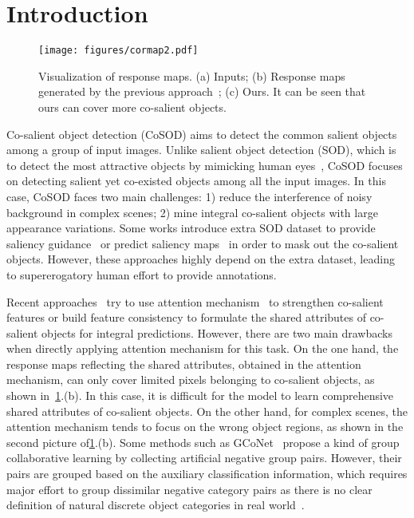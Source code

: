 \documentclass[10pt,twocolumn,letterpaper]{article}
\begin{document}
\section{Introduction}
\label{sec:intro}
\begin{figure}
\centering
	\texttt{[image: figures/cormap2.pdf]}
	\caption{Visualization of response maps. (a) Inputs; (b) Response maps generated by the previous approach~\cite{fan2021group}; (c) Ours. It can be seen that ours can cover more co-salient objects.
	}
	\label{FIG:cormap}
\end{figure}
Co-salient object detection (CoSOD) aims to detect the common salient objects among a group of input images. Unlike salient object detection (SOD), which is to detect the most attractive objects by mimicking human eyes~\cite{chen2020global, li2021uncertainty, yu2021structure, tang2021disentangled, pang2020multi, li2021salient, piao2021mfnet, liu2021samnet}, CoSOD focuses on detecting salient yet co-existed objects among all the input images. In this case, CoSOD faces two main challenges: 1) reduce the interference of noisy background in complex scenes; 2) mine integral co-salient objects with large appearance variations. Some works introduce extra SOD dataset to provide saliency guidance~\cite{zhang2020coadnet, zhang2021summarize} or predict saliency maps~\cite{jin2020icnet} in order to mask out the co-salient objects. However, these approaches highly depend on the extra dataset, leading to supererogatory human effort to provide annotations.

Recent approaches~\cite{jin2020icnet, zhang2021summarize,fan2021group, zhang2021deepacg} try to use attention mechanism~\cite{vaswani2017attention} to strengthen co-salient features or build feature consistency to formulate the shared attributes of co-salient objects for integral predictions. However, there are two main drawbacks when directly applying attention mechanism for this task. On the one hand, the response maps reflecting the shared attributes, obtained in the attention mechanism, can only cover limited pixels belonging to co-salient objects, as shown in~\cref{FIG:cormap}.(b). In this case, it is difficult for the model to learn comprehensive shared attributes of co-salient objects. On the other hand, for complex scenes, the attention mechanism tends to focus on the wrong object regions, as shown in the second picture of\cref{FIG:cormap}.(b). Some methods such as GCoNet~\cite{fan2021group} propose a kind of group collaborative learning by collecting artificial negative group pairs. However, their pairs are grouped based on the auxiliary classification information, which requires major effort to group dissimilar negative category pairs as there is no clear definition of natural discrete object categories in real world~\cite{thoma2020soft}. 
\end{document}
